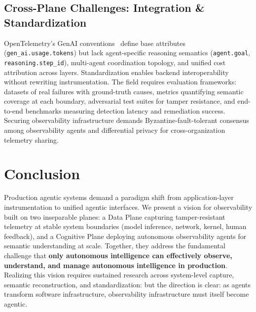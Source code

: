 \documentclass[sigplan,screen,9pt]{acmart}
\begin{document}
\subsection{Cross-Plane Challenges: Integration \& Standardization}

OpenTelemetry's GenAI conventions~\cite{otelgenai,semconv} define base attributes (\texttt{gen\_ai.usage.tokens}) but lack agent-specific reasoning semantics (\texttt{agent.goal}, \texttt{reasoning.step\_id}), multi-agent coordination topology, and unified cost attribution across layers. Standardization enables backend interoperability without rewriting instrumentation. The field requires evaluation frameworks: datasets of real failures with ground-truth causes, metrics quantifying semantic coverage at each boundary, adversarial test suites for tamper resistance, and end-to-end benchmarks measuring detection latency and remediation success. Securing observability infrastructure demands Byzantine-fault-tolerant consensus among observability agents and differential privacy for cross-organization telemetry sharing.

\section{Conclusion}

Production agentic systems demand a paradigm shift from application-layer instrumentation to unified agentic interfaces. We present a vision for observability built on two inseparable planes: a Data Plane capturing tamper-resistant telemetry at stable system boundaries (model inference, network, kernel, human feedback), and a Cognitive Plane deploying autonomous observability agents for semantic understanding at scale. Together, they address the fundamental challenge that \textbf{only autonomous intelligence can effectively observe, understand, and manage autonomous intelligence in production}. Realizing this vision requires sustained research across system-level capture, semantic reconstruction, and standardization: but the direction is clear: as agents transform software infrastructure, observability infrastructure must itself become agentic.



\end{document}
